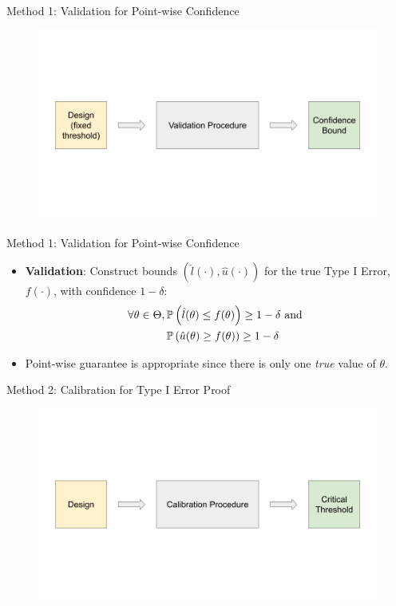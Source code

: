 \begin{frame}{Method 1: Validation for Point-wise Confidence}
\begin{figure}
    \centering
    \includegraphics[width=\linewidth]{figs/validation_scheme.png}
\end{figure}
\end{frame}

\begin{frame}{Method 1: Validation for Point-wise Confidence}
\begin{itemize}
    \item \textbf{Validation}: 
        Construct bounds $(\hat{l}(\cdot), \hat{u}(\cdot))$
        for the true Type I Error, $f(\cdot)$, with confidence $1-\delta$:
        \begin{align*}
            \forall \theta \in \Theta ,\, 
            &\mathbb{P}\left( \hat{l}(\theta) \leq f(\theta) \right) \geq 1-\delta \text{ and } \\
            &\mathbb{P}\left( \hat{u}(\theta) \geq f(\theta) \right) \geq 1-\delta
        \end{align*}
    \item Point-wise guarantee is appropriate since 
        there is only one \emph{true} value of $\theta$.
\end{itemize} 
\end{frame}

\begin{frame}{Method 2: Calibration for Type I Error Proof}
\begin{figure}
    \centering
    \includegraphics[width=\linewidth]{figs/calibration_scheme.png}
\end{figure}
\end{frame}

